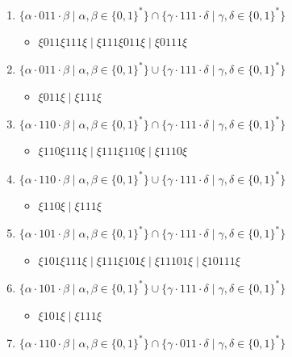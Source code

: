 \documentclass[12pt]{article}
\begin{document}
\begin{enumerate}
\begin{enumerate}[label=\arabic*)]
    \item $\{ \alpha \cdot 011 \cdot \beta \mid \alpha, \beta \in \{0, 1\}^*\} \cap \{\gamma \cdot 111 \cdot \delta \mid \gamma, \delta \in \{0, 1\}^* \}$
    \begin{itemize}
      \item $\xi 011 \xi 111 \xi \mid \xi 111 \xi 011 \xi \mid \xi 0111 \xi $
    \end{itemize}
    \item $\{ \alpha \cdot 011 \cdot \beta \mid \alpha, \beta \in \{0, 1\}^*\} \cup \{\gamma \cdot 111 \cdot \delta \mid \gamma, \delta \in \{0, 1\}^* \}$
    \begin{itemize}
      \item $\xi 011 \xi \mid \xi 111 \xi $
    \end{itemize}
    \item $\{ \alpha \cdot 110 \cdot \beta \mid \alpha, \beta \in \{0, 1\}^*\} \cap \{\gamma \cdot 111 \cdot \delta \mid \gamma, \delta \in \{0, 1\}^* \}$
    \begin{itemize}
      \item $\xi 110 \xi 111 \xi \mid \xi 111 \xi 110 \xi \mid \xi 1110 \xi $
    \end{itemize}
    \item $\{ \alpha \cdot 110 \cdot \beta \mid \alpha, \beta \in \{0, 1\}^*\} \cup \{\gamma \cdot 111 \cdot \delta \mid \gamma, \delta \in \{0, 1\}^* \}$
    \begin{itemize}
      \item $\xi 110 \xi \mid \xi 111 \xi $
    \end{itemize}
    \item $\{ \alpha \cdot 101 \cdot \beta \mid \alpha, \beta \in \{0, 1\}^*\} \cap \{\gamma \cdot 111 \cdot \delta \mid \gamma, \delta \in \{0, 1\}^* \}$
    \begin{itemize}
      \item $\xi 101 \xi 111 \xi \mid \xi 111 \xi 101 \xi \mid \xi 11101 \xi \mid \xi 10111 \xi $
    \end{itemize}
    \item $\{ \alpha \cdot 101 \cdot \beta \mid \alpha, \beta \in \{0, 1\}^*\} \cup \{\gamma \cdot 111 \cdot \delta \mid \gamma, \delta \in \{0, 1\}^* \}$
    \begin{itemize}
      \item $\xi 101 \xi \mid \xi 111 \xi $
    \end{itemize}
    \item $\{ \alpha \cdot 110 \cdot \beta \mid \alpha, \beta \in \{0, 1\}^*\} \cap \{\gamma \cdot 011 \cdot \delta \mid \gamma, \delta \in \{0, 1\}^* \}$

\end{enumerate}
\end{enumerate}
\end{document}
